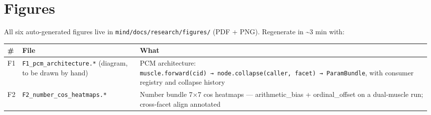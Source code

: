 \medskip

\section{Figures}

All six auto-generated figures live in \texttt{mind/docs/research/figures/}
(PDF + PNG). Regenerate in \textasciitilde3 min with:

\begin{Shaded}
\begin{Highlighting}[]
\end{Highlighting}
\end{Shaded}

\begin{longtable}[]{@{}lll@{}}
\toprule
\begin{minipage}[b]{0.30\columnwidth}\raggedright
\#\strut
\end{minipage} & \begin{minipage}[b]{0.30\columnwidth}\raggedright
File\strut
\end{minipage} & \begin{minipage}[b]{0.30\columnwidth}\raggedright
What\strut
\end{minipage}\tabularnewline
\midrule
\endhead
\begin{minipage}[t]{0.30\columnwidth}\raggedright
F1\strut
\end{minipage} & \begin{minipage}[t]{0.30\columnwidth}\raggedright
\texttt{F1\_pcm\_architecture.*} (diagram, to be drawn by hand)\strut
\end{minipage} & \begin{minipage}[t]{0.30\columnwidth}\raggedright
PCM architecture: \texttt{muscle.forward(cid)\ →\ node.collapse(caller,\ facet)\ →\ ParamBundle}, with consumer registry and collapse history\strut
\end{minipage}\tabularnewline
\begin{minipage}[t]{0.30\columnwidth}\raggedright
F2\strut
\end{minipage} & \begin{minipage}[t]{0.30\columnwidth}\raggedright
\texttt{F2\_number\_cos\_heatmaps.*}\strut
\end{minipage} & \begin{minipage}[t]{0.30\columnwidth}\raggedright
Number bundle 7×7 cos heatmaps --- arithmetic\_bias + ordinal\_offset on a dual-muscle run; cross-facet align annotated\strut

\end{minipage}
\end{longtable}
